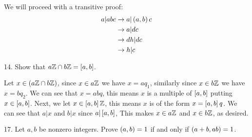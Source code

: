 \begin{mdframed}[style=darkAnswer,frametitle={Joe Starr}]
  We will proceed with a transitive proof:
  \begin{align*}
    a\vert abc & \rightarrow a\vert \left(a,b\right)c \\
               & \rightarrow a\vert dc         \\
               & \rightarrow dh\vert dc        \\
               & \rightarrow h\vert c
  \end{align*}
\end{mdframed}
\newpage
\begin{mdframed}[style=darkQuesion]
  14. Show that $a\mathbb{Z} \cap b\mathbb{Z}=\left[a,b\right]$.
\end{mdframed}

\begin{mdframed}[style=darkAnswer,frametitle={Joe Starr}]
  Let $x\in \left(a\mathbb{Z} \cap b\mathbb{Z}\right)$, since $x\in a\mathbb{Z}$ we have $x=aq_1$, similarly
  since $x\in b\mathbb{Z}$ we have$x=bq_2$. We can see that $x=abq$, this means $x$
  is a multiple of $\left[a,b\right]$ putting $x\in \left[a,b\right]$. Next, we let
  $x\in \left[a,b\right]\mathbb{Z}$, this means $x$ is of the form $x=\left[a,b\right]q$. We can see
  that $a\vert x$ and $b\vert x$ since $a\vert \left[a,b\right]$, This makes
  $x\in a\mathbb{Z}$ and $x\in b\mathbb{Z}$, as desired.
\end{mdframed}
\newpage
\begin{mdframed}[style=darkQuesion]
  17. Let $a,b$ be nonzero integers. Prove $\left(a,b\right)=1$ if and only if
  $\left(a+b,ab\right)=1$.
\end{mdframed}

